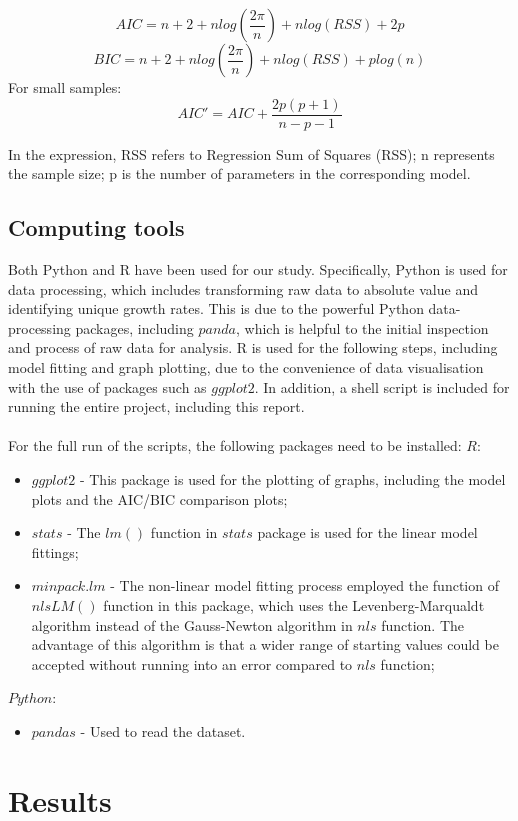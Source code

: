 \documentclass[11pt, oneside]{article}
\begin{document}
		\[AIC = n + 2 + nlog(\frac{2\pi}{n}) + nlog(RSS) + 2p\]
		\[BIC = n + 2 + nlog(\frac{2\pi}{n}) + nlog(RSS) + plog(n)\]
		For small samples:
		\[AIC' = AIC + \frac{2p(p + 1)}{n - p - 1}\]
		
		\noindent In the expression, RSS refers to Regression Sum of Squares (RSS); n represents the sample size; p is the number of parameters in the corresponding model.

 		\subsection{Computing tools}
		Both Python and R have been used for our study. Specifically, Python is used for data processing, which includes transforming raw data to absolute value and identifying unique growth rates. This is due to the powerful Python data-processing packages, including \(panda\), which is helpful to the initial inspection and process of raw data for analysis. R is used for the following steps, including model fitting and graph plotting, due to the convenience of data visualisation with the use of packages such as \(ggplot2\). In addition, a shell script is included for running the entire project, including this report. \\
		\\
		For the full run of the scripts, the following packages need to be installed: 
 	\bigbreak
 	\noindent \(R:\)
 	\begin{itemize}
	\item \(ggplot2\) - This package is used for the plotting of graphs, including the model plots and the AIC/BIC comparison plots;
	\item \(stats\) - The \(lm()\) function in \(stats\) package is used for the linear model fittings;
	\item \(minpack.lm\) - The non-linear model fitting process employed the function of \(nlsLM()\) function in this package, which uses the Levenberg-Marqualdt algorithm instead of the Gauss-Newton algorithm in \(nls\) function. The advantage of this algorithm is that a wider range of starting values could be accepted without running into an error compared to \(nls\) function;
	\end{itemize}
	\(Python:\)
	\begin{itemize}
	\item \(pandas\) - Used to read the dataset.
	\end{itemize}
		\pagebreak
	\section{Results}
	
\end{document}
